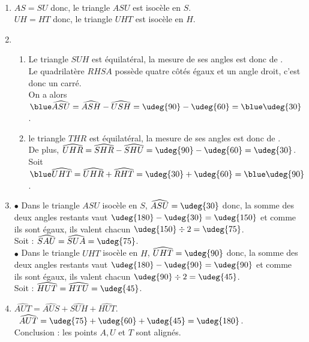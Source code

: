 \begin{colonne*exercice}
\begin{corrige}
   \ \\ [-5mm]
   \begin{enumerate}
      \item $AS =SU$ donc, {\blue le triangle $ASU$ est isocèle en $S$}. \\
      $UH = HT$ donc, {\blue le triangle $UHT$ est isocèle en $H$}.
      \item
      \begin{enumerate}
         \item Le triangle $SUH$ est équilatéral, la mesure de ses angles est donc de . \\
          Le quadrilatère $RHSA$ possède quatre côtés égaux et un angle droit, c'est donc un carré. \\
         On a alors ${\blue \widehat{ASU}} =\widehat{ASH}-\widehat{USH} =\udeg{90}-\udeg{60} ={\blue \udeg{30}}$. \\
         \item le triangle $THR$ est équilatéral, la mesure de ses angles est donc de . \\ 
         De plus, $\widehat{UHR} =\widehat{SHR}-\widehat{SHU} =\udeg{90}-\udeg{60} =\udeg{30}$. \\
         Soit ${\blue \widehat{UHT}} =\widehat{UHR} +\widehat{RHT} =\udeg{30}+\udeg{60} ={\blue \udeg{90}}$. \\
      \end{enumerate}
      \setcounter{enumi}{2}
      \item \textcolor{G1}{$\bullet$} Dans le triangle $ASU$ isocèle en $S$, $\widehat{ASU} =\udeg{30}$ donc, la somme des deux angles restants vaut $\udeg{180}-\udeg{30} =\udeg{150}$ et comme ils sont égaux, ils valent chacun $\udeg{150}\div2 =\udeg{75}$. \\
      Soit : {\blue $\widehat{SAU} =\widehat{SUA} =\udeg{75}$}. \\
          \textcolor{G1}{$\bullet$} Dans le triangle $UHT$ isocèle en $H$, $\widehat{UHT} =\udeg{90}$ donc, la somme des deux angles restants vaut $\udeg{180}-\udeg{90} =\udeg{90}$ et comme ils sont égaux, ils valent chacun $\udeg{90}\div2 =\udeg{45}$. \\
          Soit : {\blue $\widehat{HUT} = \widehat{HTU} =\udeg{45}$}.
      \item $\widehat{AUT} =\widehat{AUS}+\widehat{SUH}+\widehat{HUT}$. \\
      \quad\, $\widehat{AUT} =\udeg{75}+\udeg{60}+\udeg{45} =\udeg{180}$. \\
      Conclusion : {\blue les points $A, U$ et $T$ sont alignés}.
   \end{enumerate}
\end{corrige}

\end{colonne*exercice}


